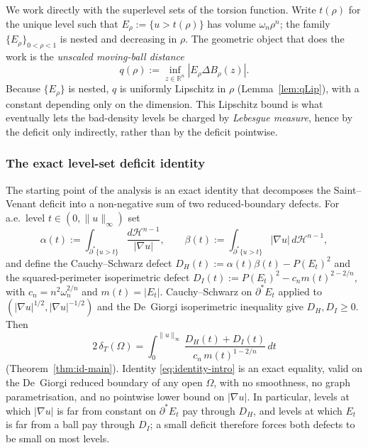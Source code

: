 \documentclass[11pt]{amsart}
\theoremstyle{definition}
\newcommand{\R}{\mathbb R}
\newcommand{\Om}{\Omega}
\newcommand{\dT}{\delta_T}
\newcommand{\Hn}{\mathcal H^{n-1}}
\newcommand{\Per}{P}
\begin{document}
We work directly with the superlevel sets of the torsion function.  Write
\(t(\rho)\) for the unique level such that
\(E_\rho:=\{u>t(\rho)\}\) has volume \(\omega_n\rho^n\); the family
\(\{E_\rho\}_{0<\rho<1}\) is nested and decreasing in \(\rho\).  The
geometric object that does the work is the \emph{unscaled moving-ball
distance}
\begin{equation}\label{eq:q-intro}
   q(\rho):=\inf_{z\in\R^n}|E_\rho\Delta B_\rho(z)|.
\end{equation}
Because \(\{E_\rho\}\) is nested, \(q\) is uniformly Lipschitz in
\(\rho\) (Lemma~\ref{lem:qLip}), with a constant depending only on the
dimension.  This Lipschitz bound is what eventually lets the bad-density
levels be charged by \emph{Lebesgue measure}, hence by the deficit only
indirectly, rather than by the deficit pointwise.

\subsubsection*{The exact level-set deficit identity}

The starting point of the analysis is an exact identity that decomposes
the Saint--Venant deficit into a non-negative sum of two reduced-boundary
defects.  For a.e.\ level \(t\in(0,\|u\|_\infty)\) set
\[
   \alpha(t):=\int_{\partial^*\{u>t\}}\frac{d\Hn}{|\nabla u|},
   \qquad
   \beta(t):=\int_{\partial^*\{u>t\}}|\nabla u|\,d\Hn,
\]
and define the Cauchy--Schwarz defect
\(D_H(t):=\alpha(t)\beta(t)-\Per(E_t)^2\) and the squared-perimeter
isoperimetric defect \(D_I(t):=\Per(E_t)^2-c_n m(t)^{2-2/n}\), with
\(c_n=n^2\omega_n^{2/n}\) and \(m(t)=|E_t|\).  Cauchy--Schwarz on
\(\partial^*E_t\) applied to \((|\nabla u|^{1/2},|\nabla u|^{-1/2})\) and
the De~Giorgi isoperimetric inequality \cite{DeGiorgi1958} give
\(D_H,D_I\ge0\).  Then
\begin{equation}\label{eq:identity-intro}
   2\,\dT(\Om)
   =\int_0^{\|u\|_\infty}
      \frac{D_H(t)+D_I(t)}{c_n\,m(t)^{1-2/n}}\,dt
\end{equation}
(Theorem~\ref{thm:id-main}).  Identity \eqref{eq:identity-intro} is an
exact equality, valid on the De~Giorgi reduced boundary of any open
\(\Om\), with no smoothness, no graph parametrisation, and no pointwise
lower bound on \(|\nabla u|\).  In particular, levels at which
\(|\nabla u|\) is far from constant on \(\partial^*E_t\) pay through
\(D_H\), and levels at which \(E_t\) is far from a ball pay through
\(D_I\); a small deficit therefore forces both defects to be small on
most levels.
\end{document}
